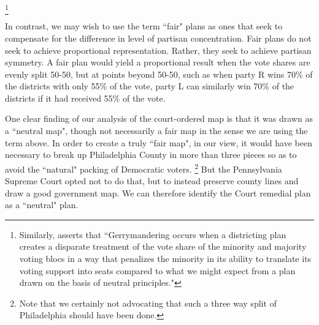     \footnote{Similarly, \citet{Grofman2018_ELJ} asserts that ``Gerrymandering occurs when a districting plan creates a disparate treatment of the vote share of the minority and majority voting blocs in a way that penalizes the minority in its ability to translate its voting support into seats compared to what we might expect from a plan drawn on the basis of neutral principles."}
\par
    In contrast, we may wish to use the term ``fair" plans as ones that seek to compensate for the difference in level of partisan concentration. Fair plans do not seek to achieve proportional representation. Rather, they seek to achieve partisan symmetry. A fair plan would yield a proportional result when the vote shares are evenly split 50-50, but at points beyond 50-50, such as when party R wins 70\% of the districts with only 55\% of the vote, party L can similarly win 70\% of the districts if it had received 55\% of the vote. 
\par
    One clear finding of our analysis of the court-ordered map is that it was drawn as a ``neutral map", though not necessarily a fair map in the sense we are using the term above. In order to create a truly ``fair map", in our view, it would have been necessary to break up Philadelphia County in more than three pieces so as to avoid the ``natural" packing of Democratic voters.
    \footnote{Note that we certainly not advocating that such a three way split of Philadelphia should have been done.}
    But the Pennsylvania Supreme Court opted not to do that, but to instead preserve county lines and draw a good government map. We can therefore identify the Court remedial plan as a ``neutral" plan.
  \par
  \par

%
